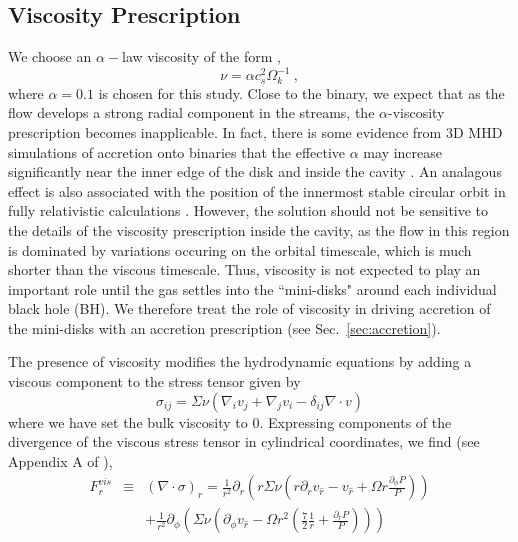 \documentclass[apj]{emulateapj}
\begin{document}
\subsection{Viscosity Prescription}
\label{sec:visc}
We choose an $\alpha-$law viscosity of the form \citep{shakura73},
\begin{equation}
  \label{eq:visc_nu}
  \nu = \alpha c_s^2 \Omega_k^{-1} \ ,
\end{equation}
where $\alpha = 0.1$ is chosen for this study. Close to the binary, we expect that as the flow develops a strong radial component in the streams, the $\alpha$-viscosity prescription becomes inapplicable. In fact, there is some evidence from 3D MHD simulations of accretion onto binaries that the effective $\alpha$ may increase significantly near the inner edge of the disk and inside the cavity \citep{shi12,noble12}. An analagous effect is also associated with the position of the innermost stable circular orbit in fully relativistic calculations \citep{penna13}. However, the solution should not be sensitive to the details of the viscosity prescription inside the cavity, as  the flow in this region is dominated by variations occuring on the orbital timescale, which is much shorter than the viscous timescale. Thus, viscosity is not expected to play an important role until the gas settles into the ``mini-disks" around each individual black hole (BH). We therefore treat the role of viscosity in driving accretion of the mini-disks with an accretion prescription (see Sec.~\ref{sec:accretion}).

The presence of viscosity modifies the hydrodynamic equations by adding a viscous component to the stress tensor given by
\begin{equation}
  \sigma_{ij} = \Sigma \nu \left(
    \nabla_iv_j + \nabla_j v_i - \delta_{ij}\nabla \cdot v
  \right)
\end{equation}
where we have set the bulk viscosity to $0$. Expressing components of the divergence of the viscous stress tensor in cylindrical coordinates, we find (see Appendix A of \citealt{dorazio13}),
\begin{eqnarray}
  F^{vis}_r &\equiv& (\nabla \cdot \sigma)_r= \frac{1}{r^2} \partial_r \left( r \Sigma \nu 
\left( r \partial_r v_{\hat{r}} - v_{\hat{r}} + \Omega r \frac{\partial_{\phi}P}{P}\right) \right) \nonumber\\
&&+ \frac{1}{r^2}\partial_{\phi}\left(
\Sigma \nu 
\left( \partial_{\phi} v_{\hat{r}} - \Omega r^2 \left(\frac{7}{2} \frac{1}{r} + \frac{\partial_{r}P}{P}\right) \right) \right) 
               \end{eqnarray}
\end{document}
